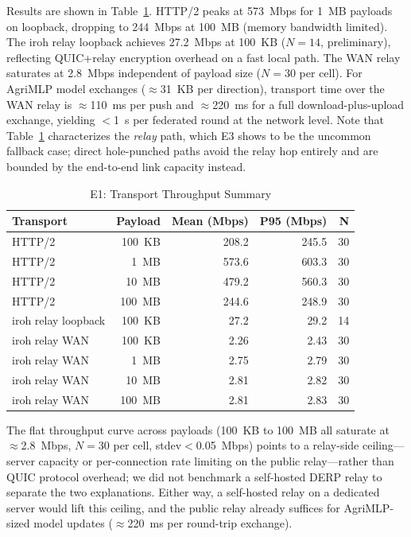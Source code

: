 ﻿\documentclass[journal]{IEEEtran}
\begin{document}
Results are shown in Table~\ref{tab:e1}. HTTP/2 peaks at 573~Mbps for 1~MB payloads on loopback, dropping to 244~Mbps at 100~MB (memory bandwidth limited). The iroh relay loopback achieves 27.2~Mbps at 100~KB ($N{=}14$, preliminary), reflecting QUIC+relay encryption overhead on a fast local path. The WAN relay saturates at 2.8~Mbps independent of payload size ($N{=}30$ per cell). For AgriMLP model exchanges ($\approx$31~KB per direction), transport time over the WAN relay is $\approx$110~ms per push and $\approx$220~ms for a full download-plus-upload exchange, yielding $<$1~s per federated round at the network level. Note that Table~\ref{tab:e1} characterizes the \emph{relay} path, which E3 shows to be the uncommon fallback case; direct hole-punched paths avoid the relay hop entirely and are bounded by the end-to-end link capacity instead.

\begin{table}[t]
\centering
\caption{E1: Transport Throughput Summary}
\label{tab:e1}
\footnotesize
\begin{tabular}{l r r r r}
\toprule
\textbf{Transport} & \textbf{Payload} & \textbf{Mean (Mbps)} & \textbf{P95 (Mbps)} & \textbf{N} \\
\midrule
HTTP/2               & 100~KB  & 208.2  & 245.5  & 30 \\
HTTP/2               & 1~MB    & 573.6  & 603.3  & 30 \\
HTTP/2               & 10~MB   & 479.2  & 560.3  & 30 \\
HTTP/2               & 100~MB  & 244.6  & 248.9  & 30 \\
\midrule
iroh relay loopback  & 100~KB  & 27.2   & 29.2   & 14 \\
\midrule
iroh relay WAN       & 100~KB  & 2.26   & 2.43   & 30 \\
iroh relay WAN       & 1~MB    & 2.75   & 2.79   & 30 \\
iroh relay WAN       & 10~MB   & 2.81   & 2.82   & 30 \\
iroh relay WAN       & 100~MB  & 2.81   & 2.83   & 30 \\
\bottomrule
\end{tabular}
\end{table}

The flat throughput curve across payloads (100~KB to 100~MB all saturate at $\approx$2.8~Mbps, $N{=}30$ per cell, stdev${<}$0.05~Mbps) points to a relay-side ceiling---server capacity or per-connection rate limiting on the public relay---rather than QUIC protocol overhead; we did not benchmark a self-hosted DERP relay to separate the two explanations. Either way, a self-hosted relay on a dedicated server would lift this ceiling, and the public relay already suffices for AgriMLP-sized model updates ($\approx$220~ms per round-trip exchange).
\end{document}
